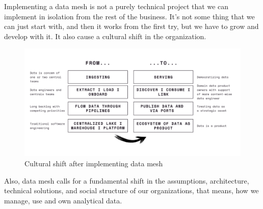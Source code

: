\documentclass[12pt, a4paper]{book}
\begin{document}
Implementing a data mesh is not a purely technical project that we can implement in isolation from the rest of the business. It's not some thing that we can just start with, and then it works from the first try, but we have to grow and develop with it. It also cause a cultural shift in the organization.

\begin{figure}[h]
	\centering
	\includegraphics[width=17.5cm]{CulturalShift.png}
	\caption{Cultural shift after implementing data mesh}
	\label{culturalshift}
\end{figure}

Also, data mesh calls for a fundamental shift in the assumptions, architecture, technical solutions, and social structure of our organizations, that means, how we manage, use and own analytical data. \cite{datamesh2022ch1}
\end{document}
